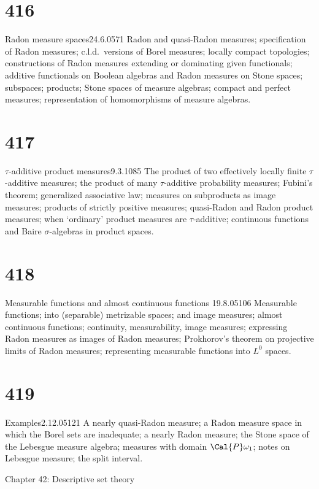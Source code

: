 \section{416}{Radon measure spaces}{24.6.05}{71}{}
{Radon and quasi-Radon measures;  specification of Radon measures;
c.l.d.\ versions of Borel measures;  locally compact topologies;
constructions of Radon
measures extending or dominating given functionals;  additive
functionals on Boolean algebras and Radon measures on Stone spaces;
subspaces;
products;  Stone spaces of measure algebras;  compact and perfect
measures;  representation
of homomorphisms of measure algebras.}

\section{417}{$\tau$-additive product measures}{9.3.10}{85}{}
{The product of two effectively locally finite $\tau$-additive
measures;  the product of many $\tau$-additive probability measures;
Fubini's theorem;  generalized associative law;  measures on subproducts
as image measures;  products of strictly positive measures;  quasi-Radon
and Radon product measures;  when `ordinary' product
measures are $\tau$-additive;  continuous functions and Baire
$\sigma$-algebras in product spaces.}

\section{418}{Measurable functions and almost continuous functions}
{19.8.05}{106}{}
{Measurable functions;  into (separable) metrizable spaces;  and
image measures;  almost continuous functions;  continuity,
measurability, image measures;  expressing Radon measures as
images of Radon measures;  Prokhorov's theorem on projective limits of
Radon measures;  representing measurable functions into $L^0$ spaces.}

\section{419}{Examples}{2.12.05}{121}{}
{A nearly quasi-Radon measure;  a Radon measure space in which the
Borel sets are inadequate;  a nearly Radon measure;  the Stone space of
the Lebesgue measure algebra;  measures with domain $\Cal{P}\omega_1$;
notes on Lebesgue measure;  the split interval.}


 Chapter 42: Descriptive set theory

